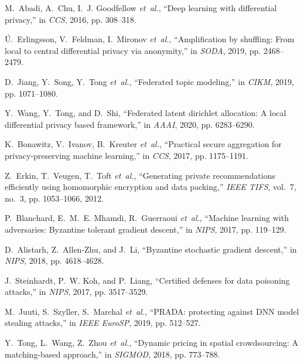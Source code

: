 \documentclass[11pt]{article}
\begin{document}
\begin{thebibliography}{10}
\begin{small}
		M.~Abadi, A.~Chu, I.~J. Goodfellow \emph{et~al.}, ``Deep learning with
		differential privacy,'' in \emph{CCS}, 2016, pp. 308--318.
		
		{\'{U}}.~Erlingsson, V.~Feldman, I.~Mironov \emph{et~al.}, ``Amplification by
		shuffling: From local to central differential privacy via anonymity,'' in
		\emph{SODA}, 2019, pp. 2468--2479.
		
		D.~Jiang, Y.~Song, Y.~Tong \emph{et~al.}, ``Federated topic modeling,'' in
		\emph{CIKM}, 2019, pp. 1071--1080.
		
		Y.~Wang, Y.~Tong, and D.~Shi, ``Federated latent dirichlet allocation: {A}
		local differential privacy based framework,'' in \emph{AAAI}, 2020, pp.
		6283--6290.
		
		K.~Bonawitz, V.~Ivanov, B.~Kreuter \emph{et~al.}, ``Practical secure
		aggregation for privacy-preserving machine learning,'' in \emph{CCS}, 2017,
		pp. 1175--1191.
		
		Z.~Erkin, T.~Veugen, T.~Toft \emph{et~al.}, ``Generating private
		recommendations efficiently using homomorphic encryption and data packing,''
		\emph{{IEEE} TIFS}, vol.~7, no.~3, pp. 1053--1066, 2012.
		
		P.~Blanchard, E.~M.~E. Mhamdi, R.~Guerraoui \emph{et~al.}, ``Machine learning
		with adversaries: Byzantine tolerant gradient descent,'' in \emph{NIPS},
		2017, pp. 119--129.
		
		D.~Alistarh, Z.~Allen{-}Zhu, and J.~Li, ``Byzantine stochastic gradient
		descent,'' in \emph{NIPS}, 2018, pp. 4618--4628.
		
		J.~Steinhardt, P.~W. Koh, and P.~Liang, ``Certified defenses for data poisoning
		attacks,'' in \emph{NIPS}, 2017, pp. 3517--3529.
		
		M.~Juuti, S.~Szyller, S.~Marchal \emph{et~al.}, ``{PRADA:} protecting against
		{DNN} model stealing attacks,'' in \emph{{IEEE} EuroSP}, 2019, pp. 512--527.
		
		Y.~Tong, L.~Wang, Z.~Zhou \emph{et~al.}, ``Dynamic pricing in spatial
		crowdsourcing: {A} matching-based approach,'' in \emph{SIGMOD}, 2018, pp.
		773--788.
		

\end{small}
\end{thebibliography}
\end{document}
